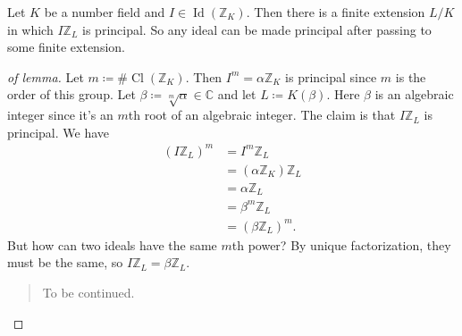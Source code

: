 \begin{lemma}

Let \(K\) be a number field and
\(I\in \operatorname{Id}({\mathbb{Z}}_K)\). Then there is a finite
extension \(L/K\) in which \(I{\mathbb{Z}}_L\) is principal. So any
ideal can be made principal after passing to some finite extension.

\end{lemma}

\begin{proof}[of lemma]

Let \(m \coloneqq\# \operatorname{Cl}({\mathbb{Z}}_K)\). Then
\(I^m = \alpha{\mathbb{Z}}_K\) is principal since \(m\) is the order of
this group. Let \(\beta\coloneqq\sqrt[m]{\alpha} \in {\mathbb{C}}\) and
let \(L \coloneqq K( \beta)\). Here \(\beta\) is an algebraic integer
since it's an \(m\)th root of an algebraic integer. The claim is that
\(I{\mathbb{Z}}_L\) is principal. We have
\begin{align*}
(I {\mathbb{Z}}_L)^m
&= I^m {\mathbb{Z}}_L \\
&= ( \alpha{\mathbb{Z}}_K) {\mathbb{Z}}_L \\
&= \alpha{\mathbb{Z}}_L \\
&= \beta^m {\mathbb{Z}}_L \\
&= (\beta {\mathbb{Z}}_L)^m
.\end{align*}
But how can two ideals have the same \(m\)th power? By unique
factorization, they must be the same, so
\(I{\mathbb{Z}}_L = \beta {\mathbb{Z}}_L\).

\begin{quote}
To be continued.
\end{quote}

\end{proof}

\cleardoublepage

\renewcommand{\listtheoremname}{}
\listoftheorems[ignoreall,show={definition}, numwidth=3.5em]
\cleardoublepage

\renewcommand{\listtheoremname}{}
\listoftheorems[ignoreall,show={theorem,proposition}, numwidth=3.5em]
\cleardoublepage

\renewcommand{\listtheoremname}{}
\listoftheorems[ignoreall,show={exercise}, numwidth=3.5em]
\cleardoublepage

\listoffigures
\cleardoublepage


\printbibliography[title=Bibliography]



